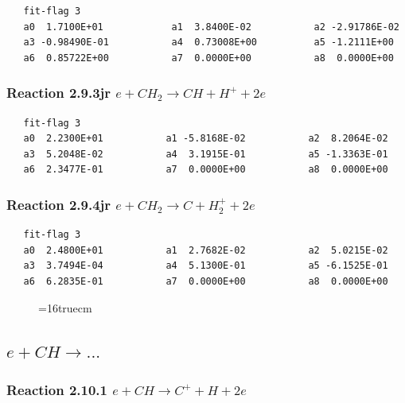 \documentclass[12pt,dvipdfmx]{article}
\begin{document}
\begin{small}\begin{verbatim}
   fit-flag 3
   a0  1.7100E+01            a1  3.8400E-02           a2 -2.91786E-02
   a3 -0.98490E-01           a4  0.73008E+00          a5 -1.2111E+00
   a6  0.85722E+00           a7  0.0000E+00           a8  0.0000E+00
\end{verbatim}\end{small}

\subsubsection{
Reaction 2.9.3jr   $e + CH_{2} \rightarrow CH + H^{+} + 2e $
}

\begin{small}\begin{verbatim}
   fit-flag 3
   a0  2.2300E+01           a1 -5.8168E-02           a2  8.2064E-02
   a3  5.2048E-02           a4  3.1915E-01           a5 -1.3363E-01
   a6  2.3477E-01           a7  0.0000E+00           a8  0.0000E+00
\end{verbatim}\end{small}

\subsubsection{
Reaction 2.9.4jr   $e + CH_{2} \rightarrow C + H_{2}^{+} + 2e $
}

\begin{small}\begin{verbatim}
   fit-flag 3
   a0  2.4800E+01           a1  2.7682E-02           a2  5.0215E-02
   a3  3.7494E-04           a4  5.1300E-01           a5 -6.1525E-01
   a6  6.2835E-01           a7  0.0000E+00           a8  0.0000E+00
\end{verbatim}\end{small}

\begin{figure} \label{met.1_2.8}
\epsfxsize=16truecm
\end{figure}
\newpage

\subsection{
$e + CH \rightarrow ... $
}
\subsubsection{
Reaction 2.10.1   $e + CH \rightarrow C^+ + H + 2e $
}
\end{document}
